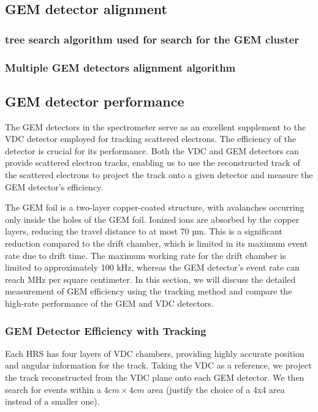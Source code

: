 \subsection{GEM detector alignment}

\subsubsection{tree search algorithm used for search for the GEM cluster}
\subsubsection{Multiple GEM detectors alignment algorithm }
\subsection{GEM detector performance}

The GEM detectors in the spectrometer serve as an excellent supplement to the VDC detector employed for tracking scattered electrons. The efficiency of the detector is crucial for its performance. Both the VDC and GEM detectors can provide scattered electron tracks, enabling us to use the reconstructed track of the scattered electrons to project the track onto a given detector and measure the GEM detector's efficiency.

The GEM foil is a two-layer copper-coated structure, with avalanches occurring only inside the holes of the GEM foil. Ionized ions are absorbed by the copper layers, reducing the travel distance to at most 70 µm. This is a significant reduction compared to the drift chamber, which is limited in its maximum event rate due to drift time. The maximum working rate for the drift chamber is limited to approximately 100 kHz, whereas the GEM detector's event rate can reach MHz per square centimeter. In this section, we will discuss the detailed measurement of GEM efficiency using the tracking method and compare the high-rate performance of the GEM and VDC detectors.

\subsubsection{GEM Detector Efficiency with Tracking}

Each HRS has four layers of VDC chambers, providing highly accurate position and angular information for 
the track. Taking the VDC as a reference, we project the track reconstructed from the VDC plane 
onto each GEM detector. We then search for events within a $4 cm \times 4 cm$ area 
(justify the choice of a 4x4 area instead of a smaller one). 

